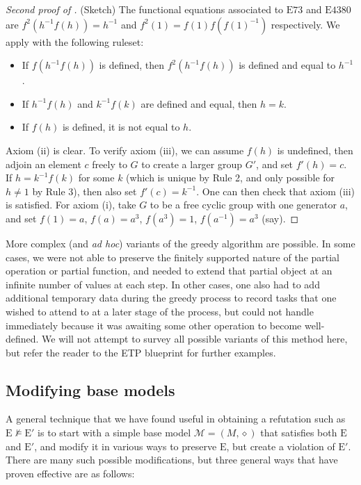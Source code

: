 \documentclass[12pt]{amsart}
\theoremstyle{definition}
\newcommand{\op}{\diamond}
\newcommand{\nmodels}{\not\models}
\newcommand{\Magma}{{\mathcal{M}}}
\newcommand{\Eq}[1]{\mathrm{E}#1}
\newcommand{\E}{\mathrm{E}}
\begin{document}
\begin{proof}[Second proof of ] (Sketch)  The functional equations associated to $\Eq{73}$ and $\Eq{4380}$ are
$f^2(h^{-1} f(h)) =h^{-1}$ and $f^2(1) = f(1) f(f(1)^{-1})$ respectively.  We apply  with the following ruleset:
\begin{itemize}
  \item[1.]  If $f(h^{-1} f(h))$ is defined, then $f^2(h^{-1} f(h))$ is defined and equal to $h^{-1}$.
  \item[2.]  If $h^{-1} f(h)$ and $k^{-1} f(k)$ are defined and equal, then $h=k$.
  \item[3.]  If $f(h)$ is defined, it is not equal to $h$.
\end{itemize}
Axiom (ii) is clear.  To verify axiom (iii), we can assume $f(h)$ is undefined, then adjoin an element $c$ freely to $G$ to create a larger group $G'$, and set $f'(h) = c$.  If $h = k^{-1} f(k)$ for some $k$ (which is unique by Rule 2, and only possible for $h \neq 1$ by Rule 3), then also set $f'(c) = k^{-1}$.  One can then check that axiom (iii) is satisfied.  For axiom (i), take $G$ to be a free cyclic group with one generator $a$, and set $f(1) = a$, $f(a) = a^3$, $f(a^3) = 1$, $f(a^{-1}) = a^3$ (say).
\end{proof}

More complex (and \emph{ad hoc}) variants of the greedy algorithm are possible.  In some cases, we were not able to preserve the finitely supported nature of the partial operation or partial function, and needed to extend that partial object at an infinite number of values at each step.  In other cases, one also had to add additional temporary data during the greedy process to record tasks that one wished to attend to at a later stage of the process, but could not handle immediately because it was awaiting some other operation to become well-defined.  We will not attempt to survey all possible variants of this method here, but refer the reader to the ETP blueprint for further examples.

\subsection{Modifying base models}\label{modify-base}

A general technique that we have found useful in obtaining a refutation such as $\E \nmodels {\E'}$ is to start with a simple base model $\Magma = (M,\op)$ that satisfies both $\E$ and ${\E'}$, and modify it in various ways to preserve $\E$, but create a violation of ${\E'}$.  There are many such possible modifications, but three general ways that have proven effective are as follows:
\end{document}
